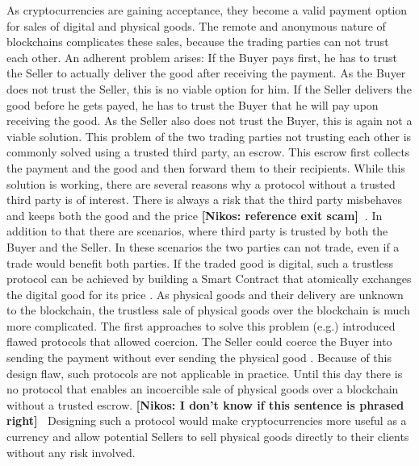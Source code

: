 \documentclass{cacthesis}
\newcommand{\authnote}[3]{{ \footnotesize \textbf{#1[#2: #3]~}}}
\newcommand{\niknote}[1]{\authnote{\color{red}}{Nikos}{#1}}
\begin{document}
	As cryptocurrencies are gaining acceptance, they become a valid payment option for sales of digital and physical goods. The remote and anonymous nature of blockchains complicates these sales, because the trading parties can not trust each other. An adherent problem arises: If the Buyer pays first, he has to trust the Seller to actually deliver the good after receiving the payment. As the Buyer does not trust the Seller, this is no viable option for him. If the Seller delivers the good before he gets payed, he has to trust the Buyer that he will pay upon receiving the good. As the Seller also does not trust the Buyer, this is again not a viable solution. This problem of the two trading parties not trusting each other is commonly solved using a trusted third party, an escrow. This escrow first collects the payment and the good and then forward them to their recipients. While this solution is working, there are several reasons why a protocol without a trusted third party is of interest. There is always a risk that the third party misbehaves and keeps both the good and the price \niknote{reference exit scam}. In addition to that there are scenarios, where third party is trusted by both the Buyer and the Seller. In these scenarios the two parties can not trade, even if a trade would benefit both parties. 
	If the traded good is digital, such a trustless protocol can be achieved by building a Smart Contract that atomically exchanges the digital good for its price \cite{asgaonkar_solving_2019}. As physical goods and their delivery are unknown to the blockchain, the trustless sale of physical goods over the blockchain is much more complicated. The first approaches to solve this problem (e.g.\cite{zimbeck_two_nodate}) introduced flawed protocols that allowed coercion. The Seller could coerce the Buyer into sending the payment without ever sending the physical good \cite{goharshady_irrationality_2021}. Because of this design flaw, such protocols are not applicable in practice. Until this day there is no protocol that enables an incoercible sale of physical goods over a blockchain without a trusted escrow. \niknote{I don't know if this sentence is phrased right} Designing such a protocol would make cryptocurrencies more useful as a currency and allow potential Sellers to sell physical goods directly to their clients without any risk involved. \newline
	
\end{document}
